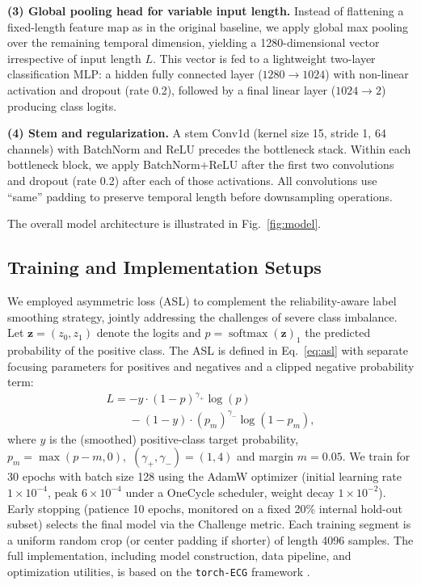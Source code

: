 \documentclass[twocolumn]{cinc}
\begin{document}
\textbf{(3) Global pooling head for variable input length.} Instead of flattening a fixed-length feature map as in the original baseline, we apply global max pooling over the remaining temporal dimension, yielding a 1280-dimensional vector irrespective of input length $L$. This vector is fed to a lightweight two-layer classification MLP: a hidden fully connected layer ($1280 \to 1024$) with non-linear activation and dropout (rate 0.2), followed by a final linear layer ($1024 \to 2$) producing class logits.

\textbf{(4) Stem and regularization.} A stem Conv1d (kernel size 15, stride 1, 64 channels) with BatchNorm and ReLU precedes the bottleneck stack. Within each bottleneck block, we apply BatchNorm+ReLU after the first two convolutions and dropout (rate 0.2) after each of those activations. All convolutions use “same” padding to preserve temporal length before downsampling operations.

The overall model architecture is illustrated in Fig.~\ref{fig:model}.


\subsection{Training and Implementation Setups}
\label{subsec:train}


We employed asymmetric loss (ASL) \cite{ridnik2021asymmetric_loss} to complement the reliability-aware label smoothing strategy, jointly addressing the challenges of severe class imbalance. Let ${\mathbf{z}} = (z_0, z_1)$ denote the logits and $p=\operatorname{softmax}({\mathbf{z}})_1$ the predicted probability of the positive class. The ASL is defined in Eq.~\ref{eq:asl} with separate focusing parameters for positives and negatives and a clipped negative probability term:
\begin{equation}
\label{eq:asl}
\begin{multlined}
L = -y \cdot (1-p)^{\gamma_{+}} \log(p) \\
\phantom{L = } - (1-y) \cdot (p_m)^{\gamma_{-}} \log(1-p_m),
\end{multlined}
\end{equation}
where $y$ is the (smoothed) positive-class target probability, $p_m = \max(p - m, 0),$ $(\gamma_{+},\gamma_{-})=(1,4)$ and margin $m=0.05$. We train for 30 epochs with batch size 128 using the AdamW optimizer (initial learning rate $1\times10^{-4}$, peak $6\times10^{-4}$ under a OneCycle scheduler, weight decay $1\times10^{-2}$). Early stopping (patience 10 epochs, monitored on a fixed 20\% internal hold-out subset) selects the final model via the Challenge metric. Each training segment is a uniform random crop (or center padding if shorter) of length 4096 samples. The full implementation, including model construction, data pipeline, and optimization utilities, is based on the \texttt{torch-ECG} framework \cite{torch_ecg_paper}.
\end{document}
